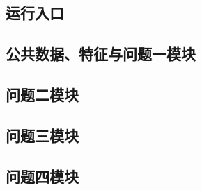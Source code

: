 \documentclass[UTF8,a4paper,zihao=-4]{ctexart}
\begin{document}
\subsection{运行入口}






\subsection{公共数据、特征与问题一模块}








\subsection{问题二模块}




\subsection{问题三模块}




\subsection{问题四模块}



\end{document}

